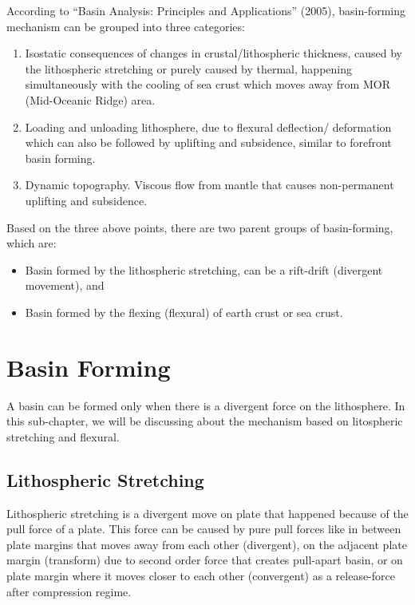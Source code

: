 \documentclass[
  letterpaper,
  DIV=11,
  numbers=noendperiod,
  oneside]{scrreprt}
\begin{document}
According to {``Basin Analysis: Principles and Applications''} (2005),
basin-forming mechanism can be grouped into three categories:

\begin{enumerate}
\def\labelenumi{\arabic{enumi}.}
\item
  Isostatic consequences of changes in crustal/lithospheric thickness,
  caused by the lithospheric stretching or purely caused by thermal,
  happening simultaneously with the cooling of sea crust which moves
  away from MOR (Mid-Oceanic Ridge) area.
\item
  Loading and unloading lithosphere, due to flexural deflection/
  deformation which can also be followed by uplifting and subsidence,
  similar to forefront basin forming.
\item
  Dynamic topography. Viscous flow from mantle that causes non-permanent
  uplifting and subsidence.
\end{enumerate}

Based on the three above points, there are two parent groups of
basin-forming, which are:

\begin{itemize}
\item
  Basin formed by the lithospheric stretching, can be a rift-drift
  (divergent movement), and
\item
  Basin formed by the flexing (flexural) of earth crust or sea crust.
\end{itemize}

\hypertarget{basin-forming}{%
\section{Basin Forming}\label{basin-forming}}

A basin can be formed only when there is a divergent force on the
lithosphere. In this sub-chapter, we will be discussing about the
mechanism based on litospheric stretching and flexural.

\hypertarget{lithospheric-stretching}{%
\subsection{Lithospheric Stretching}\label{lithospheric-stretching}}

Lithospheric stretching is a divergent move on plate that happened
because of the pull force of a plate. This force can be caused by pure
pull forces like in between plate margins that moves away from each
other (divergent), on the adjacent plate margin (transform) due to
second order force that creates pull-apart basin, or on plate margin
where it moves closer to each other (convergent) as a release-force
after compression regime.
\end{document}
